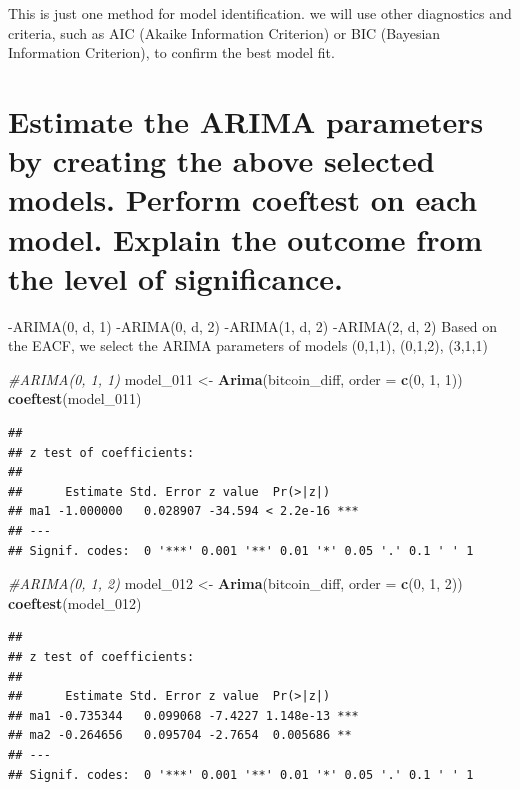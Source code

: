 \documentclass[
]{book}
\newenvironment{Shaded}{\begin{snugshade}}{\end{snugshade}}
\newcommand{\AttributeTok}[1]{\textcolor[rgb]{0.13,0.29,0.53}{#1}}
\newcommand{\CommentTok}[1]{\textcolor[rgb]{0.56,0.35,0.01}{\textit{#1}}}
\newcommand{\DecValTok}[1]{\textcolor[rgb]{0.00,0.00,0.81}{#1}}
\newcommand{\FunctionTok}[1]{\textcolor[rgb]{0.13,0.29,0.53}{\textbf{#1}}}
\newcommand{\NormalTok}[1]{#1}
\newcommand{\OtherTok}[1]{\textcolor[rgb]{0.56,0.35,0.01}{#1}}
\begin{document}
This is just one method for model identification.
we will use other diagnostics and criteria, such as AIC (Akaike Information Criterion) or BIC (Bayesian Information Criterion), to confirm the best model fit.

\section{Estimate the ARIMA parameters by creating the above selected models. Perform coeftest on each model. Explain the outcome from the level of significance.}\label{estimate-the-arima-parameters-by-creating-the-above-selected-models.-perform-coeftest-on-each-model.-explain-the-outcome-from-the-level-of-significance.}

-ARIMA(0, d, 1)
-ARIMA(0, d, 2)
-ARIMA(1, d, 2)
-ARIMA(2, d, 2)
Based on the EACF, we select the ARIMA parameters of models (0,1,1), (0,1,2), (3,1,1)

\begin{Shaded}
\begin{Highlighting}[]
\CommentTok{\#ARIMA(0, 1, 1)}
\NormalTok{model\_011 }\OtherTok{\textless{}{-}} \FunctionTok{Arima}\NormalTok{(bitcoin\_diff, }\AttributeTok{order =} \FunctionTok{c}\NormalTok{(}\DecValTok{0}\NormalTok{, }\DecValTok{1}\NormalTok{, }\DecValTok{1}\NormalTok{))}
\FunctionTok{coeftest}\NormalTok{(model\_011)}
\end{Highlighting}
\end{Shaded}

\begin{verbatim}
## 
## z test of coefficients:
## 
##      Estimate Std. Error z value  Pr(>|z|)    
## ma1 -1.000000   0.028907 -34.594 < 2.2e-16 ***
## ---
## Signif. codes:  0 '***' 0.001 '**' 0.01 '*' 0.05 '.' 0.1 ' ' 1
\end{verbatim}

\begin{Shaded}
\begin{Highlighting}[]
\CommentTok{\#ARIMA(0, 1, 2)}
\NormalTok{model\_012 }\OtherTok{\textless{}{-}} \FunctionTok{Arima}\NormalTok{(bitcoin\_diff, }\AttributeTok{order =} \FunctionTok{c}\NormalTok{(}\DecValTok{0}\NormalTok{, }\DecValTok{1}\NormalTok{, }\DecValTok{2}\NormalTok{))}
\FunctionTok{coeftest}\NormalTok{(model\_012)}
\end{Highlighting}
\end{Shaded}

\begin{verbatim}
## 
## z test of coefficients:
## 
##      Estimate Std. Error z value  Pr(>|z|)    
## ma1 -0.735344   0.099068 -7.4227 1.148e-13 ***
## ma2 -0.264656   0.095704 -2.7654  0.005686 ** 
## ---
## Signif. codes:  0 '***' 0.001 '**' 0.01 '*' 0.05 '.' 0.1 ' ' 1
\end{verbatim}
\end{document}
